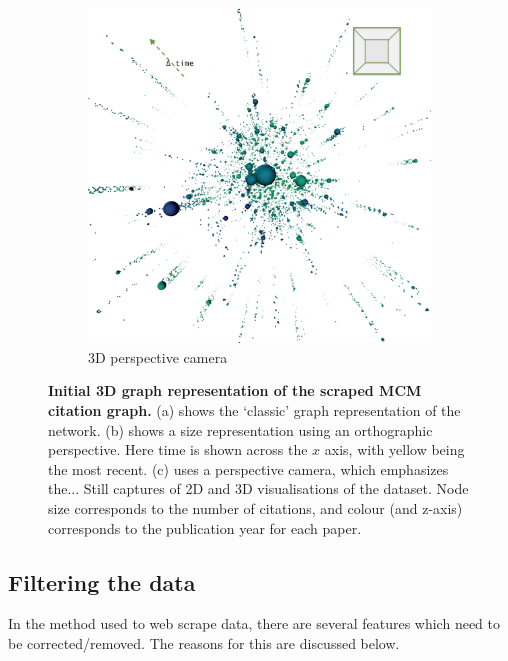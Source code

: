 \begin{figure}[H]
     \begin{subfigure}[b]{0.75\textwidth}
         \centering
         \includegraphics[width=\textwidth]{figures_c3/threeall.png}
         \caption{3D perspective camera}
         \label{fig:3dgeph}
     \end{subfigure}


        \caption{ \textbf{Initial 3D graph representation of the scraped MCM citation graph.} (a) shows the `classic' graph representation of the network. (b) shows a size representation using an orthographic perspective. Here time is shown across the $x$ axis, with yellow being the most recent. (c)
        uses a perspective camera, which emphasizes the...
        Still captures of 2D and 3D visualisations of the dataset. Node size corresponds to the number of citations, and colour (and z-axis) corresponds to the publication year for each paper.}
        \label{fig:weball}

\end{figure}


\subsection{Filtering the data}\label{sec:filter3d}


In the method used to web scrape data, there are several features which need to be corrected/removed. The reasons for this are discussed below.
 
